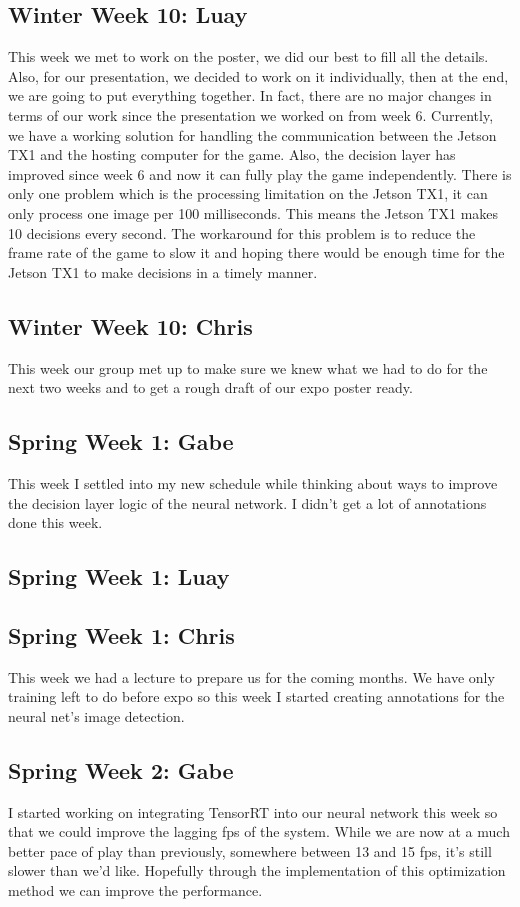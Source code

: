 \documentclass[onecolumn, draftclsnofoot,10pt, compsoc]{IEEEtran}
\begin{document}
\subsection{Winter Week 10: Luay}
This week we met to work on the poster, we did our best to fill all the details. Also, for our presentation, we decided to work on it individually, then at the end, we are going to put everything together. In fact, there are no major changes in terms of our work since the presentation we worked on from week 6. Currently, we have a working solution for handling the communication between the Jetson TX1 and the hosting computer for the game. Also, the decision layer has improved since week 6 and now it can fully play the game independently. There is only one problem which is the processing limitation on the Jetson TX1, it can only process one image per 100 milliseconds. This means the Jetson TX1 makes 10 decisions every second. The workaround for this problem is to reduce the frame rate of the game to slow it and hoping there would be enough time for the Jetson TX1 to make decisions in a timely manner.
\subsection{Winter Week 10: Chris}
This week our group met up to make sure we knew what we had to do for the next two weeks and to get a rough draft of our expo poster ready.
\subsection{Spring Week 1: Gabe}
This week I settled into my new schedule while thinking about ways to improve the decision layer logic of the neural network. I didn't get a lot of annotations done this week.
\subsection{Spring Week 1: Luay}
\subsection{Spring Week 1: Chris}
This week we had a lecture to prepare us for the coming months. We have only training left to do before expo so this week I started creating annotations for the neural net's image detection.
\subsection{Spring Week 2: Gabe}
I started working on integrating TensorRT into our neural network this week so that we could improve the lagging fps of the system. While we are now at a much better pace of play than previously, somewhere between 13 and 15 fps, it's still slower than we'd like. Hopefully through the implementation of this optimization method we can improve the performance.
\end{document}

